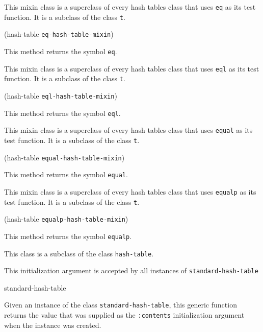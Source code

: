 
This mixin class is a superclass of every hash tables class that uses
\texttt{eq} as its test function.  It is a subclass of the class
\texttt{t}.

{\small{} {(hash-table {\tt eq-hash-table-mixin})}
}

This method returns the symbol \texttt{eq}.


This mixin class is a superclass of every hash tables class that uses
\texttt{eql} as its test function.  It is a subclass of the class
\texttt{t}.

{\small{} {(hash-table {\tt eql-hash-table-mixin})}
}

This method returns the symbol \texttt{eql}.


This mixin class is a superclass of every hash tables class that uses
\texttt{equal} as its test function.  It is a subclass of the class
\texttt{t}.

{\small{} {(hash-table {\tt equal-hash-table-mixin})}
}

This method returns the symbol \texttt{equal}.


This mixin class is a superclass of every hash tables class that uses
\texttt{equalp} as its test function.  It is a subclass of the class
\texttt{t}.

{\small{} {(hash-table {\tt equalp-hash-table-mixin})}
}

This method returns the symbol \texttt{equalp}.


This class is a subclass of the class \texttt{hash-table}.


This initialization argument is accepted by all instances of
\texttt{standard-hash-table}

{\small{} {standard-hash-table}
}

Given an instance of the class \texttt{standard-hash-table}, this
generic function returns the value that was supplied as the
\texttt{:contents} initialization argument when the instance was
created.


